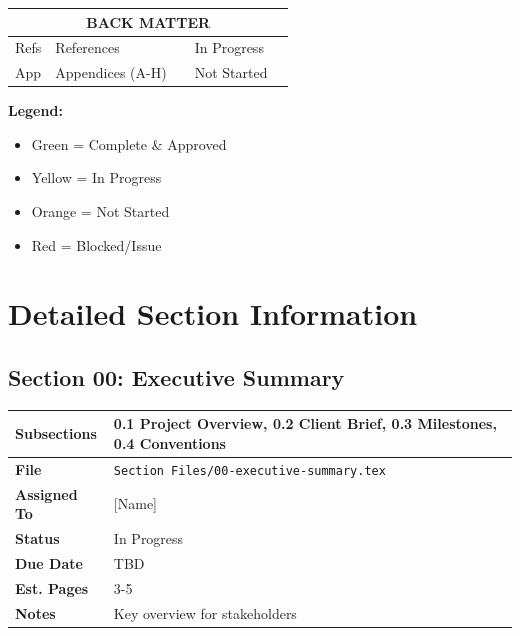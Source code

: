 \documentclass[12pt]{article}
\begin{document}
\begin{tabular}{|p{2.5cm}|p{5cm}|p{2.5cm}|p{2.5cm}|p{2.5cm}|}
\hline
\multicolumn{5}{|c|}{\cellcolor{gray!30}\textbf{BACK MATTER}} \\
\hline

Refs & References & & \cellcolor{yellow}In Progress & \\
App & Appendices (A-H) & & \cellcolor{orange}Not Started & \\

\hline
\end{tabular}

\vspace{1cm}

\textbf{Legend:}
\begin{itemize}
    \item {}Green = Complete \& Approved
    \item {}Yellow = In Progress
    \item {}Orange = Not Started
    \item {}Red = Blocked/Issue
\end{itemize}

\newpage

\section*{Detailed Section Information}

\subsection*{Section 00: Executive Summary}
\begin{tabular}{|l|l|}
\hline
\textbf{Subsections} & 0.1 Project Overview, 0.2 Client Brief, 0.3 Milestones, 0.4 Conventions \\
\hline
\textbf{File} & \texttt{Section Files/00-executive-summary.tex} \\
\hline
\textbf{Assigned To} & [Name] \\
\hline
\textbf{Status} & In Progress \\
\hline
\textbf{Due Date} & TBD \\
\hline
\textbf{Est. Pages} & 3-5 \\
\hline
\textbf{Notes} & Key overview for stakeholders \\
\hline
\end{tabular}

\vspace{0.5cm}
\end{document}
